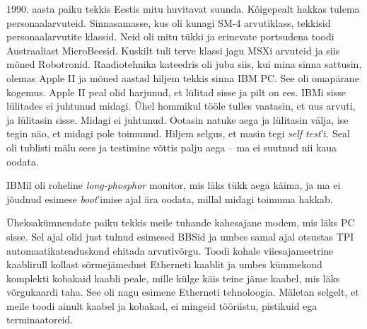 1990. aasta paiku tekkis Eestis 
mitu huvitavat suunda. Kõigepealt hakkas tulema 
personaalarvuteid. Sinnasamasse, kus oli kunagi SM-4 arvutiklass, tekkisid 
personaalarvutite klassid. Neid oli mitu tükki ja erinevate portsudena 
toodi Austraaliast MicroBeesid. Kuskilt tuli terve klassi jagu MSXi 
arvuteid ja siis mõned 
Robotronid. 
Raadiotehnika kateedris oli juba siis, kui mina sinna sattusin, olemas 
Apple II ja mõned aastad hiljem tekkis sinna IBM 
PC. See oli omapärane kogemus. Apple II peal olid 
harjunud, et lülitad sisse ja pilt on ees. IBMi sisse lülitades ei juhtunud midagi. Ühel hommikul tööle tulles vaatasin, et uus 
arvuti, ja lülitasin sisse. Midagi ei juhtunud. Ootasin natuke aega ja lülitasin välja, ise 
tegin näo, et midagi pole toimunud. Hiljem selgus, et masin tegi \emph{self 
test}'i. Seal oli tublisti mälu sees ja testimine võttis palju aega -- ma ei 
suutnud nii kaua oodata. 


IBMil oli roheline \emph{long-phosphor} monitor, mis läks tükk 
aega käima, ja ma ei jõudnud esimese \emph{boot}'imise ajal ära oodata, millal 
midagi toimuma hakkab.

Üheksakümnendate paiku tekkis meile tuhande kahesajane modem, mis läks 
PC sisse. Sel ajal olid just tulnud esimesed BBSid ja umbes samal ajal otsustas TPI 
automaatikateaduskond 
ehitada arvutivõrgu. Toodi kohale viiesajameetrine kaablirull 
kollast sõrmejämedust Etherneti kaablit ja umbes kümmekond komplekti 
kobakaid kaabli peale, mille külge käis teine jäme kaabel, 
mis läks võrgukaardi taha. See oli nagu esimene Etherneti tehnoloogia. 
Mäletan selgelt, et meile toodi ainult kaabel ja kobakad, ei mingeid tööriistu, pistikuid ega terminaatoreid.

